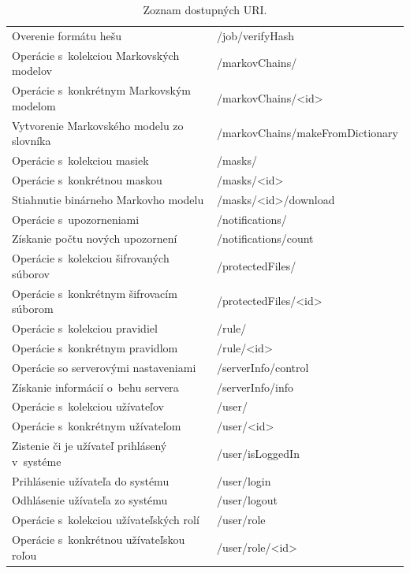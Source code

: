 \documentclass[slovak]{fitthesis}
\begin{document}
\begin{table}[h]
\begin{center}
\begin{tabular}{ |p{8cm}|p{7.4cm}|  }
          Overenie formátu hešu & /job/verifyHash \\
          Operácie s~kolekciou Markovských modelov & /markovChains/ \\
          Operácie s~konkrétnym Markovským modelom & /markovChains/<id> \\
          Vytvorenie Markovského modelu zo slovníka & /markovChains/makeFromDictionary \\
          Operácie s~kolekciou masiek & /masks/ \\
          Operácie s~konkrétnou maskou & /masks/<id> \\
          Stiahnutie binárneho Markovho modelu & /masks/<id>/download \\
          Operácie s~upozorneniami & /notifications/ \\
          Získanie počtu nových upozornení & /notifications/count \\
          Operácie s~kolekciou šifrovaných súborov & /protectedFiles/ \\
          Operácie s~konkrétnym šifrovacím súborom & /protectedFiles/<id> \\
          Operácie s~kolekciou pravidiel & /rule/ \\
          Operácie s~konkrétnym pravidlom & /rule/<id> \\
          Operácie so serverovými nastaveniami & /serverInfo/control \\
          Získanie informácií o~behu servera & /serverInfo/info \\
          Operácie s~kolekciou užívateľov & /user/ \\
          Operácie s~konkrétnym užívateľom & /user/<id> \\
          Zistenie či je užívateľ prihlásený v~systéme & /user/isLoggedIn \\
          Prihlásenie užívateľa do systému & /user/login \\
          Odhlásenie užívateľa zo systému & /user/logout \\
          Operácie s~kolekciou užívateľských rolí & /user/role \\
          Operácie s~konkrétnou užívateľskou roľou & /user/role/<id> \\
         \hline
        \end{tabular}
      \caption{Zoznam dostupných URI.}
      \label{zoznamURItable}
  \end{center}
\end{table}
\end{document}
